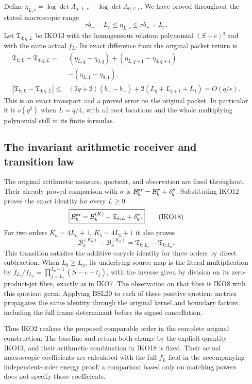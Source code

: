 \documentclass[11pt,a4paper]{article}
\begin{document}
Define $\eta_{L,r}=\log\det A_{\chi,L,r}-\log\det A_{0,L,r}$.
We have proved throughout the stated macroscopic range
\[
 rb_- -L_r\leq\eta_{L,r}\leq rb_++L_r.
 \tag{IKO16}
\]
Let $\mathfrak T_{0;q,L}$ be IKO13 with the homogeneous relation
polynomial $(S-c)^q$ and with the same actual $f_L$. Its exact
difference from the original packet return is
\[
 \begin{split}
 \mathfrak T_{k;L}-\mathfrak T_{0;q,L}
   ={}& (\eta_{L,q}-\eta_{0,q})
       +(\eta_{L,q+1}-\eta_{0,q+1})\\
      &-(\eta_{L,1}-\eta_{0,1}),\\
 |\mathfrak T_{k;L}-\mathfrak T_{0;q,L}|
   \leq{}&(2q+2)(b_+-b_-)+2(L_q+L_{q+1}+L_1)
         =O(q/e).
 \end{split}
 \tag{IKO17}
\]
This is an exact transport and a proved error on the original packet.
In particular it is $o(q^2)$ when $L=q/4$, with all root locations
and the whole multiplying polynomial still in its finite formulas.

\subsection{The invariant arithmetic receiver and transition law}
The original arithmetic measure, quotient, and observation are fixed
throughout. Their already proved comparison with $\sigma$ is
$\mathcal B_k^{\rm ar}=\mathcal B_k^\sigma+\delta_k^\sigma$.
Substituting IKO12 proves the exact identity for every $L\geq0$
\[
 \boxed{\mathcal B_k^{\rm ar}
      =\mathcal B_k^{(K)}-\mathfrak T_{k;L}+\delta_k^\sigma.}
 \tag{IKO18}
\]
For two orders $K_a=4L_a+1$, $K_b=4L_b+1$ it also proves
\[
 \mathcal B_k^{(K_b)}-\mathcal B_k^{(K_a)}
       =\mathfrak T_{k;L_b}-\mathfrak T_{k;L_a}.
 \tag{IKO19}
\]
This transition satisfies the additive cocycle identity for three
orders by direct subtraction. When $L_b\geq L_a$, its underlying
source map is the literal multiplication by
$f_{L_b}/f_{L_a}=\prod_{j=L_a}^{L_b-1}(S-c-t_j)$, with the inverse
given by division on its zero-product-jet fibre, exactly as in IKO7.
The observation on that fibre is IKO8 with this quotient germ.
Applying BSL20 to each of these positive quotient metrics propagates
the same identity through the original kernel and boundary factors,
including the full frame determinant before its signed cancellation.

Thus IKO2 realizes the proposed comparable order in the complete
original construction. The baseline and return both change by the
explicit quantity IKO13, and their arithmetic combination in IKO18
is fixed. Their actual macroscopic coefficients are calculated with
the full $f_L$ field in the accompanying independent-order energy
proof; a comparison based only on matching powers does not specify
those coefficients.
\end{document}
